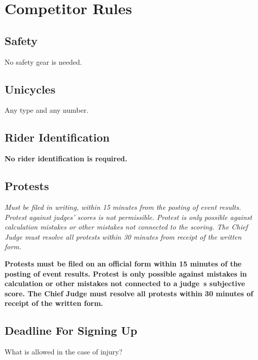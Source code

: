 \chapter{Competitor Rules}

\section{Safety}

No safety gear is needed.

\section{Unicycles}

Any type and any number.

\section{Rider Identification}

\textbf{No rider identification is required.}

\section{Protests}

\textit{Must be filed in writing, within 15 minutes from the posting of event results.
Protest against judges' scores is not permissible.
Protest is only possible against calculation mistakes or other mistakes not connected to the scoring.
The Chief Judge must resolve all protests within 30 minutes from receipt of the written form.}

\textbf{Protests must be filed on an official form within 15 minutes of the posting of event results. Protest is only possible against mistakes in calculation or other mistakes not connected to a judge~s subjective score. The Chief Judge must resolve all protests within 30 minutes of receipt of the written form.}

\section{Deadline For Signing Up}

\begin{framed}
What is allowed in the case of injury?
\end{framed}

